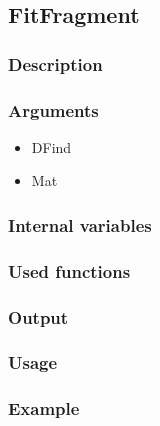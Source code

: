 \subsection{FitFragment}
\subsubsection{Description}
\subsubsection{Arguments}

\begin{itemize}
\item DFind
\item Mat
\end{itemize}
\subsubsection{Internal variables}
\subsubsection{Used functions}
\subsubsection{Output}
\subsubsection{Usage}
\subsubsection{Example}



